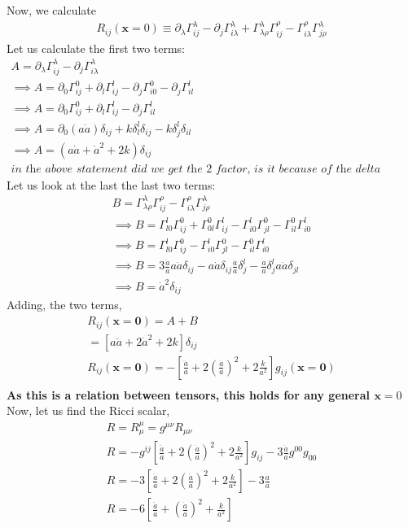 \documentclass[12pt]{report}
\newcommand{\mbf}[1]{\mathbf{#1}}
\newcommand{\tbf}[1]{\textbf{#1}}
\newcommand{\tit}[1]{\textit{#1}}
\newcommand{\ch}[2]{\Gamma^{#1}_{#2}}
\newcommand{\p}{\partial}
\begin{document}
Now, we calculate 
\begin{eqnarray*}
R_{ij}(\mbf{x}=0) \equiv \p_{\lambda}\ch{\lambda}{ij} - \p_{j}\ch{\lambda}{i \lambda} + \ch{\lambda}{\lambda \rho}\ch{\rho}{ij} - \ch{\rho}{i \lambda}\ch{\lambda}{j \rho}
\end{eqnarray*}
Let us calculate the first two terms:
\begin{eqnarray*}
A=\p_{\lambda}\ch{\lambda}{ij} - \p_{j}\ch{\lambda}{i \lambda}\\
\implies A= \p_0 \ch{0}{ij} + \p_l \ch{l}{ij} - \p_j \ch{0}{i0} - \p_j \ch{l}{il} \\
\implies A= \p_0 \ch{0}{ij} + \p_l \ch{l}{ij} - \p_j \ch{l}{il} \\
\implies A= \p_0 (a\dot{a})\delta_{ij} + k \delta^l_l \delta_{ij} - k \delta^l_j \delta_{il} \\
\implies A= (a\dot{a}+\dot{a}^2+2k)\delta_{ij}\\
\tit{in the above statement did we get the 2 factor, is it because of the delta function?}
\end{eqnarray*}
Let us look at the last the last two terms:
\begin{eqnarray*}
B=\ch{\lambda}{\lambda \rho}\ch{\rho}{ij} - \ch{\rho}{i \lambda}\ch{\lambda}{j \rho}\\
\implies B=\ch{l}{l0}\ch{0}{ij}+\ch{0}{0l}\ch{l}{ij}-\ch{l}{i0}\ch{0}{jl}-\ch{0}{il}\ch{l}{i0}\\
\implies B=\ch{l}{l0}\ch{0}{ij}-\ch{l}{i0}\ch{0}{jl}-\ch{0}{il}\ch{l}{i0}\\
\implies B=3\frac{\dot{a}}{a}a\dot{a}\delta_{ij} - a\dot{a}\delta_{ij}\frac{\dot{a}}{a}\delta^l_j-\frac{\dot{a}}{a}\delta^l_j a\dot{a}\delta_{jl}\\
\implies B= \dot{a}^2 \delta_{ij}
\end{eqnarray*}
Adding, the two terms,
\begin{eqnarray*}
R_{ij}(\mbf{x=0})=A+B\\
=\left[a\ddot{a} + 2\dot{a}^2 +2k\right]\delta_{ij}\\
R_{ij}(\mbf{x=0})=-\left[\frac{\ddot{a}}{a} + 2\left(\frac{\dot{a}}{a}\right)^2 +2\frac{k}{a^2}\right]g_{ij}(\mbf{x=0})\\
\end{eqnarray*}
\tbf{As this is a relation between tensors, this holds for any general $\mbf{x}=0$}
Now, let us find the Ricci scalar,
\begin{eqnarray*}
R=R^\mu_\mu=g^{\mu \nu}R_{\mu \nu}\\
R=-g^{ij}\left[\frac{\ddot{a}}{a} + 2\left(\frac{\dot{a}}{a}\right)^2 +2\frac{k}{a^2}\right]g_{ij} - 3\frac{\ddot{a}}{a}g^{00} g_{00}\\
R=-3\left[\frac{\ddot{a}}{a} + 2\left(\frac{\dot{a}}{a}\right)^2 +2\frac{k}{a^2}\right] - 3\frac{\ddot{a}}{a}\\
R=-6\left[\frac{\ddot{a}}{a} + \left(\frac{\dot{a}}{a}\right)^2 +\frac{k}{a^2}\right] \\
\end{eqnarray*}
\end{document}
